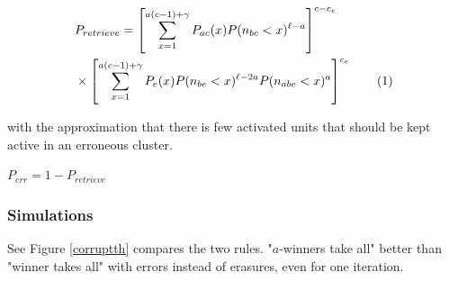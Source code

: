 \documentclass[english,10pt,twocolumn]{IEEEtran}
\newcommand\numberthis{\addtocounter{equation}{1}\tag{\theequation}}
\theoremstyle{definition}
\begin{document}
	
	
		\begin{align*}
	&P_{retrieve} = \left [ \sum_{x = 1}^{a(c-1) + \gamma} P_{ac}(x) P(n_{bc} < x)^{\ell-a} \right ]^{c - c_e}\\ 
	 &\times \left [ \sum_{x = 1}^{a(c-1) +\gamma} P_e(x) P(n_{be} < x)^{\ell-2a} P(n_{abe} < x)^a \right ]^{c_e} \numberthis \label{from_err_th}
	\end{align*}
	
	with the approximation that there is few activated units that should be kept active in an erroneous cluster.

	
	$P_{err} = 1 - P_{retrieve}$	

	
	
	\subsubsection{Simulations}
	See Figure \ref{corruptth} compares the two rules.
	"$a$-winners take all" better than "winner takes all" with errors instead of erasures, even for one iteration.
	
\end{document}
